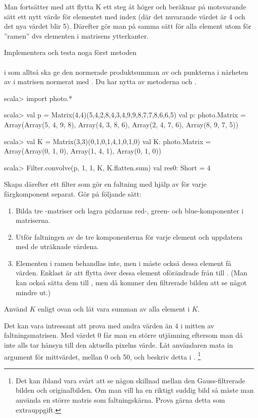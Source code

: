 \noindent Man fortsätter med att flytta K ett steg åt höger och beräknar på motsvarande sätt ett nytt värde för elementet med index  (där det nuvarande värdet är 4 och det nya värdet blir 5). Därefter gör man på samma sätt för alla element utom för ”ramen” dvs elementen i matrisens ytterkanter.

Implementera och testa noga först metoden\\
\\ i  som alltså ska ge den normerade produktsumman av  och punkterna i närheten av  i matrisen  normerat med .  Du har nytta av metoderna  och .

\begin{REPLnonum}
scala> import photo.*

scala> val p = Matrix(4,4)(5,4,2,8,4,3,4,9,9,8,7,7,8,6,6,5)
val p: photo.Matrix = Array(Array(5, 4, 9, 8), Array(4, 3, 8, 6), Array(2, 4, 7, 6), Array(8, 9, 7, 5))

scala> val K = Matrix(3,3)(0,1,0,1,4,1,0,1,0)
val K: photo.Matrix = Array(Array(0, 1, 0), Array(1, 4, 1), Array(0, 1, 0))

scala> Filter.convolve(p, 1, 1, K, K.flatten.sum)
val res0: Short = 4
\end{REPLnonum}

Skapa därefter ett filter  som gör en faltning med hjälp av  för varje färgkomponent separat. Gör på följande sätt:
\begin{enumerate}
	\item Bilda tre -matriser och lagra pixlarnas red-, green- och blue-komponenter i matriserna.
	\item Utför faltningen av de tre komponenterna för varje element och uppdatera  med de uträknade värdena.
	\item Elementen i ramen behandlas inte, men i  måste också dessa element få värden. Enklast är att flytta över dessa element oförändrade från  till . (Man kan också sätta dem till , men då kommer den filtrerade bilden att se något mindre ut.)
\end{enumerate}

Använd  $K$ enligt ovan och låt  vara summan av alla element i $K$. 

Det kan vara intressant att prova med andra värden än 4 i mitten av faltningsmatrisen. Med värdet 0 får man en större utjämning eftersom man då inte alls tar hänsyn till den aktuella pixelns värde. Låt användaren mata in argument för mittvärdet, mellan 0 och 50, och beskriv detta i . \footnote{Det kan ibland vara svårt att se någon skillnad mellan den Gauss-filtrerade bilden och originalbilden. Om man vill ha en riktigt suddig bild så måste man använda en större matris som faltningskärna. Prova gärna detta som extrauppgift. }


